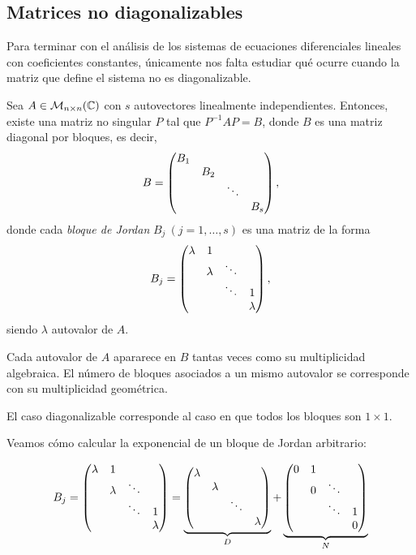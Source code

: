 \documentclass[../ecuaciones_diferenciales.tex]{subfiles}
\begin{document}
\subsection{Matrices no diagonalizables}

Para terminar con el análisis de los sistemas de ecuaciones diferenciales
lineales con coeficientes constantes, únicamente nos falta estudiar qué ocurre
cuando la matriz que define el sistema no es diagonalizable.

\begin{theorem}
	Sea \(A \in \mathcal{M}_{n \times n}(\mathbb{C})\) con \(s\) autovectores
	linealmente independientes. Entonces, existe una matriz no singular \(P\)
	tal que \(P^{-1} A P = B\), donde \(B\) es una matriz diagonal por bloques,
	es decir,
	\[B = \begin{pmatrix}B_1 & & & \\ & B_2 & & \\ & & \ddots & \\ & & & B_s\end{pmatrix},\]
	donde cada \emph{bloque de Jordan} \(B_j\ (j = 1, \dots, s)\) es una matriz de
	la forma
	\[B_j = \begin{pmatrix}\lambda & 1 & & \\ & \lambda & \ddots & \\ & & \ddots & 1 \\ & & &
			\lambda\end{pmatrix},\]
	siendo \(\lambda\) autovalor de \(A\).
\end{theorem}

\begin{remark}
	Cada autovalor de \(A\) apararece en \(B\) tantas veces como su
	multiplicidad algebraica. El número de bloques asociados a un mismo
	autovalor se corresponde con su multiplicidad geométrica.
\end{remark}

\begin{remark}
	El caso diagonalizable corresponde al caso en que todos los bloques son \(1
	\times 1\).
\end{remark}

Veamos cómo calcular la exponencial de un bloque de Jordan arbitrario:

\[B_j = \begin{pmatrix}\lambda & 1 & & \\ & \lambda & \ddots & \\ & & \ddots & 1 \\ & &
		& \lambda\end{pmatrix} =
	\underbrace{\begin{pmatrix}\lambda & & & \\ & \lambda & & \\ & & \ddots & \\ & & & \lambda\end{pmatrix}}_D
	+ \underbrace{\begin{pmatrix}0 & 1 & & \\ & 0 & \ddots & \\ & & \ddots & 1 \\ & & & 0\end{pmatrix}}_N\]
\end{document}
